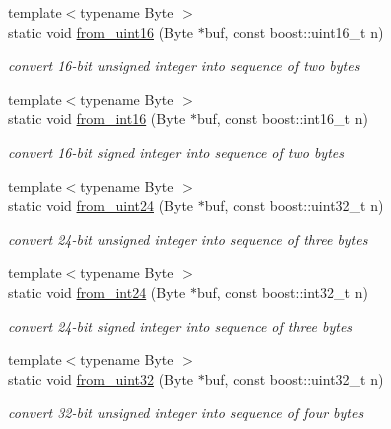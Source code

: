 \begin{DoxyCompactItemize}
{\footnotesize template$<$typename Byte $>$ }\\static void \hyperlink{structpion_1_1algorithm_a9c5dbfc05e297e824b47e03c6cf4ce26}{from\-\_\-uint16} (Byte $\ast$buf, const boost\-::uint16\-\_\-t n)
\begin{DoxyCompactList}\small\item\em convert 16-\/bit unsigned integer into sequence of two bytes \end{DoxyCompactList}\item 
{\footnotesize template$<$typename Byte $>$ }\\static void \hyperlink{structpion_1_1algorithm_a7668dc2bd3cc56d59353e8664ca128d5}{from\-\_\-int16} (Byte $\ast$buf, const boost\-::int16\-\_\-t n)
\begin{DoxyCompactList}\small\item\em convert 16-\/bit signed integer into sequence of two bytes \end{DoxyCompactList}\item 
{\footnotesize template$<$typename Byte $>$ }\\static void \hyperlink{structpion_1_1algorithm_a72de6ae9d5cee3b2fed7014a0bbe612c}{from\-\_\-uint24} (Byte $\ast$buf, const boost\-::uint32\-\_\-t n)
\begin{DoxyCompactList}\small\item\em convert 24-\/bit unsigned integer into sequence of three bytes \end{DoxyCompactList}\item 
{\footnotesize template$<$typename Byte $>$ }\\static void \hyperlink{structpion_1_1algorithm_ada38cebfc1f9988ee34695663e260abb}{from\-\_\-int24} (Byte $\ast$buf, const boost\-::int32\-\_\-t n)
\begin{DoxyCompactList}\small\item\em convert 24-\/bit signed integer into sequence of three bytes \end{DoxyCompactList}\item 
{\footnotesize template$<$typename Byte $>$ }\\static void \hyperlink{structpion_1_1algorithm_a5c78cafafadb680180ff97f1eaf58fce}{from\-\_\-uint32} (Byte $\ast$buf, const boost\-::uint32\-\_\-t n)
\begin{DoxyCompactList}\small\item\em convert 32-\/bit unsigned integer into sequence of four bytes \end{DoxyCompactList}\item 

\end{DoxyCompactItemize}
